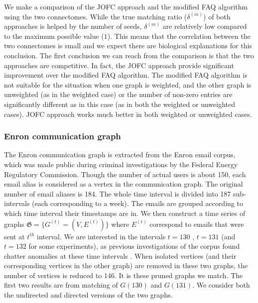 \documentclass[12pt,oneside,final]{thesis}
\begin{document}
We make  a comparison of the JOFC approach and the modified FAQ algorithm using the two connectomes. While the true matching ratio ($\delta^{(m)}$) of both approaches is helped by the number of seeds,  $\delta^{(m)}$ are relatively low compared to the maximum possible value ($1$). This means that the correlation between the two connectomes is small and we expect there are biological explanations for this conclusion.  
The first conclusion we can reach from the comparison is that the two approaches are competitive. In fact, the JOFC approach provide significant improvement over the modified FAQ algorithm. The modified FAQ algorithm is not suitable for the situation when one graph is weighted, and the other graph is unweighted (as in the weighted case) or the number of non-zero entries are significantly different as in this case (as in both the weighted or unweighted cases). JOFC approach works much better in both weighted or unweighted cases. 

\subsubsection{Enron communication graph}
The Enron communication graph is extracted from the  Enron  email corpus, which was made public during criminal investigations by the  Federal Energy Regulatory Commission. Though the number of actual users is about 150,  each email alias is considered as a vertex in the communication graph. The original number of email aliases is 184. The whole time interval is divided into 187 sub-intervals (each corresponding to a week). The emails are grouped according to which time interval their timestamps are in. We then construct a time series of graphs $\mathfrak{G}=\{G^{(t)} = (V,E^{(t)})\}$ where $E^{(t)}$ correspond to emails that were sent at $t^{th}$ interval. We are interested in the intervals $t=130$ , $t=131$ (and $t=132$ for some experiments), as previous  investigations of the corpus found chatter anomalies at these time intervals \cite{EnronStudy}. When isolated vertices (and their corresponding vertices in the other graph) are removed in these two graphs, the number of vertices is reduced to 146. It is these pruned graphs we match. The first two results are from matching of $G(130)$ and $G(131)$. We consider both the undirected and directed versions of the two graphs.
\end{document}
